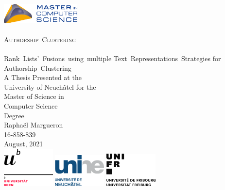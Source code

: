 \begin{titlepage}
  \vspace*{\fill}
  \begin{center}
    \includegraphics[width=0.30\textwidth]{img/MSc_quer.png}
    \\[1.5cm]
    \makebox[\linewidth]{\rule{0.8\paperwidth}{0.6pt}}
    \\[0.9cm]
    {\Huge \scshape Authorship~Clustering}
    \\[0.5cm]
    \makebox[\linewidth]{\rule{0.8\paperwidth}{0.6pt}}
    \\[0.5cm]
    {\Large Rank~Lists'~Fusions~using~multiple Text~Representations~Strategies for Authorship~Clustering}
    \\[2.0cm]
    {\large A Thesis Presented at the \\ University of Neuchâtel for the \\ Master of Science in \\ Computer Science \\ Degree}
    \\[3.5cm]
    {\Large Raphaël Margueron}
    \\
    {\large 16-858-839}
    \\[0.8cm]
    {\large August, 2021}
    \\[4.0cm]
    \includegraphics[width=0.20\textwidth]{img/UNI_Bern.png}
    \hfill
    \includegraphics[width=0.20\textwidth]{img/UNI_Neuenburg.png}
    \hfill
    \includegraphics[width=0.20\textwidth]{img/UNI_Fribourg.png}
  \end{center}
  \vspace*{\fill}
\end{titlepage}
